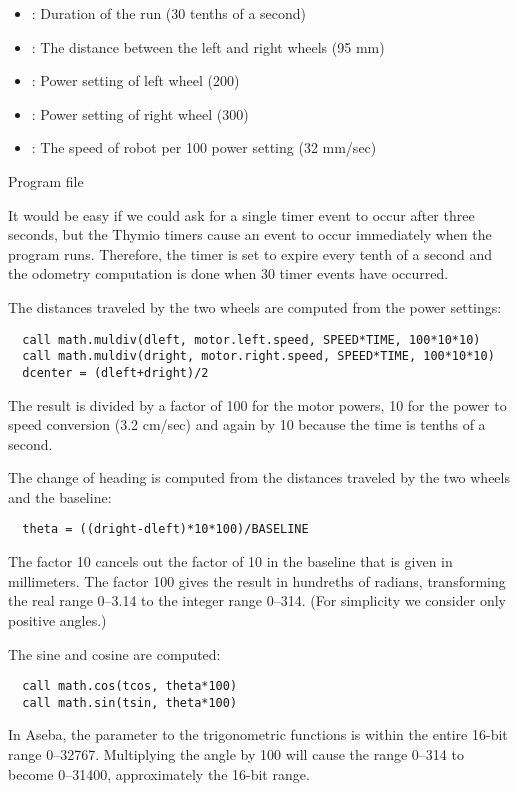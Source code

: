 
\begin{itemize}
\item {}: Duration of the run (30 tenths of a second)
\item {}: The distance between the left and right wheels (95 mm)
\item {}: Power setting of left wheel (200)
\item {}: Power setting of right wheel (300)
\item {}: The speed of robot per 100 power setting (32 mm/sec)
\end{itemize}


{\raggedleft \hfill Program file }

It would be easy if we could ask for a single timer event to occur
after three seconds, but the Thymio timers cause an event to occur
immediately when the program runs.
Therefore, the timer is set to expire every tenth of a second and the
odometry computation is done when 30 timer events have occurred.

The distances traveled by the two wheels are computed from the power settings:
\begin{verbatim}
  call math.muldiv(dleft, motor.left.speed, SPEED*TIME, 100*10*10)
  call math.muldiv(dright, motor.right.speed, SPEED*TIME, 100*10*10)
  dcenter = (dleft+dright)/2
\end{verbatim}
The result is divided by a factor of 100 for the motor powers,
10 for the power to speed conversion (3.2 cm/sec) and again by 10
because the time is tenths of a second.

The change of heading is computed from the distances traveled by the two wheels
and the baseline:
\begin{verbatim}
  theta = ((dright-dleft)*10*100)/BASELINE
\end{verbatim}
The factor 10 cancels out the factor of 10 in the baseline that
is given in millimeters.
The factor 100 gives the result in hundreths of radians,
transforming the real range 0--3.14 to the integer range 0--314.
(For simplicity we consider only positive angles.)

The sine and cosine are computed:
\begin{verbatim}
  call math.cos(tcos, theta*100)
  call math.sin(tsin, theta*100)
\end{verbatim}
In Aseba, the parameter to the trigonometric functions is within
the entire 16-bit range 0--32767. Multiplying the angle by 100 will cause the range 0--314 to become 0--31400, approximately the 16-bit range.

